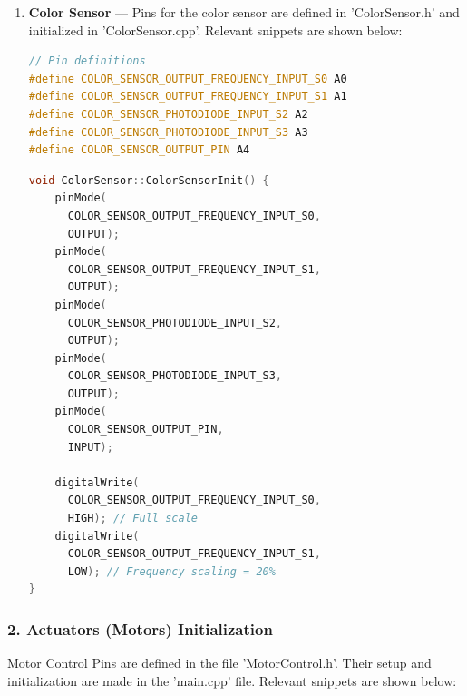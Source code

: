 \documentclass[conference]{IEEEtran}
\begin{document}
\begin{enumerate}[label=\alph*)]
\begin{lstlisting}[language=C++, caption=IR sensor pin definitions in RobotNavigation.h]
// Line sensor digital pins
#define LINE_SENSOR_LEFT 13
#define LINE_SENSOR_RIGHT 12
\end{lstlisting}

\begin{lstlisting}[language=C++, caption=IR sensor pin initialization in RobotNavigation.cpp]
void RobotNavigation::begin() {
  pinMode(LINE_SENSOR_LEFT, INPUT);
  pinMode(LINE_SENSOR_RIGHT, INPUT);
}
\end{lstlisting}

\begin{lstlisting}[language=C++, caption=IR sensor pin initialization in main.cpp]
void setup() {
  ...
  // Start navigation system
  robotNav.begin();
}
\end{lstlisting}

\item \textbf{Color Sensor} — Pins for the color sensor are defined in 'ColorSensor.h' and initialized in 'ColorSensor.cpp'. Relevant snippets are shown below:

\begin{lstlisting}[language=C++, caption=Color sensor pin definitions in ColorSensor.h]
// Pin definitions
#define COLOR_SENSOR_OUTPUT_FREQUENCY_INPUT_S0 A0
#define COLOR_SENSOR_OUTPUT_FREQUENCY_INPUT_S1 A1
#define COLOR_SENSOR_PHOTODIODE_INPUT_S2 A2
#define COLOR_SENSOR_PHOTODIODE_INPUT_S3 A3
#define COLOR_SENSOR_OUTPUT_PIN A4
\end{lstlisting}

\begin{lstlisting}[language=C++, caption=Color sensor pin initialization in ColorSensor.cpp]
void ColorSensor::ColorSensorInit() {
    pinMode(
      COLOR_SENSOR_OUTPUT_FREQUENCY_INPUT_S0,
      OUTPUT);
    pinMode(
      COLOR_SENSOR_OUTPUT_FREQUENCY_INPUT_S1,
      OUTPUT);
    pinMode(
      COLOR_SENSOR_PHOTODIODE_INPUT_S2,
      OUTPUT);
    pinMode(
      COLOR_SENSOR_PHOTODIODE_INPUT_S3,
      OUTPUT);
    pinMode(
      COLOR_SENSOR_OUTPUT_PIN,
      INPUT);

    digitalWrite(
      COLOR_SENSOR_OUTPUT_FREQUENCY_INPUT_S0,
      HIGH); // Full scale
    digitalWrite(
      COLOR_SENSOR_OUTPUT_FREQUENCY_INPUT_S1,
      LOW); // Frequency scaling = 20%
}
\end{lstlisting}
\end{enumerate}


\subsubsection*{\textbf{2. Actuators (Motors) Initialization}}
Motor Control Pins are defined in the file 'MotorControl.h'. Their setup and initialization are made in the 'main.cpp' file. Relevant snippets are shown below:
\end{document}

